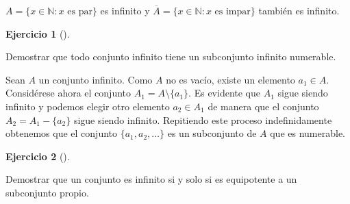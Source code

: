 \documentclass[
  a4paper,
]{scrreport}
\theoremstyle{definition}
\newtheorem{exercise}{Ejercicio}[chapter]
\theoremstyle{remark}
\begin{document}
\begin{tcolorbox}[enhanced jigsaw, opacitybacktitle=0.6, bottomrule=.15mm, colback=white, breakable, leftrule=.75mm, toprule=.15mm, colframe=quarto-callout-tip-color-frame, colbacktitle=quarto-callout-tip-color!10!white, coltitle=black, left=2mm, opacityback=0, rightrule=.15mm, bottomtitle=1mm, arc=.35mm, titlerule=0mm, title=\textcolor{quarto-callout-tip-color}{\faLightbulb}\hspace{0.5em}{Solución}, toptitle=1mm]

\(A=\{x\in\mathbb{N}: x \mbox{ es par}\}\) es infinito y
\(\overline A=\{x\in\mathbb{N}: x \mbox{ es impar}\}\) también es
infinito.

\end{tcolorbox}

\begin{exercise}[]\protect\hypertarget{exr-subconjunto-infinito-numerable}{}\label{exr-subconjunto-infinito-numerable}

Demostrar que todo conjunto infinito tiene un subconjunto infinito
numerable.

\end{exercise}

\begin{tcolorbox}[enhanced jigsaw, opacitybacktitle=0.6, bottomrule=.15mm, colback=white, breakable, leftrule=.75mm, toprule=.15mm, colframe=quarto-callout-tip-color-frame, colbacktitle=quarto-callout-tip-color!10!white, coltitle=black, left=2mm, opacityback=0, rightrule=.15mm, bottomtitle=1mm, arc=.35mm, titlerule=0mm, title=\textcolor{quarto-callout-tip-color}{\faLightbulb}\hspace{0.5em}{Solución}, toptitle=1mm]

Sean \(A\) un conjunto infinito. Como \(A\) no es vacío, existe un
elemento \(a_1\in A\). Considérese ahora el conjunto
\(A_1 = A\setminus \{a_1\}\). Es evidente que \(A_1\) sigue siendo
infinito y podemos elegir otro elemento \(a_2\in A_1\) de manera que el
conjunto \(A_2=A_1-\{a_2\}\) sigue siendo infinito. Repitiendo este
proceso indefinidamente obtenemos que el conjunto
\(\{a_1, a_2, \ldots\}\) es un subconjunto de \(A\) que es numerable.

\end{tcolorbox}

\begin{exercise}[]\protect\hypertarget{exr-conjunto-equipotente-subconjunto}{}\label{exr-conjunto-equipotente-subconjunto}

Demostrar que un conjunto es infinito si y solo si es equipotente a un
subconjunto propio.

\end{exercise}
\end{document}

